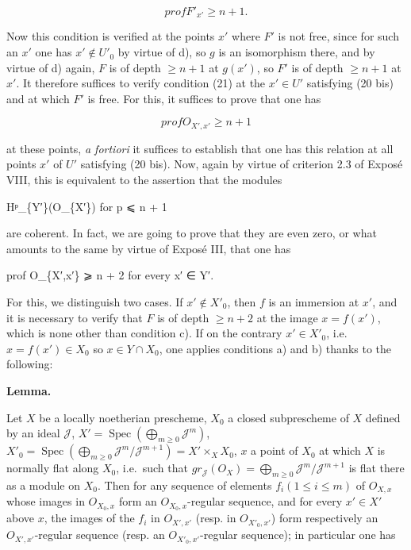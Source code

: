 \documentclass[
  11pt,
  a4paper,
]{book}
\newenvironment{Shaded}{}{}
\newcommand{\NormalTok}[1]{#1}
\newcounter{none} %
\begin{document}
\[ prof F'_{x'} \geqslant n + 1. \]

Now this condition is verified at the points \(x'\) where \(F'\) is not
free, since for such an \(x'\) one has \(x' \notin
U'_{0}\) by virtue of d), so \(g\) is an isomorphism there, and by
virtue of d) again, \(F\) is of depth \(\geqslant n + 1\) at \(g(x')\),
so \(F'\) is of depth \(\geqslant n + 1\) at \(x'\). It therefore
suffices to verify condition (21) at the \(x' \in
U'\) satisfying (20 bis) and at which \(F'\) is free. For this, it
suffices to prove that one has

\[ prof O_{X',x'} \geqslant n + 1 \]

at these points, \emph{a fortiori} it suffices to establish that one has
this relation at all points \(x'\) of \(U'\) satisfying (20 bis). Now,
again by virtue of criterion 2.3 of Exposé VIII, this is equivalent to
the assertion that the modules

\begin{Shaded}
\begin{Highlighting}[]
\NormalTok{Hᵖ\_\{Y′\}(O\_\{X′\}) for p ⩽ n + 1}
\end{Highlighting}
\end{Shaded}

are coherent. In fact, we are going to prove that they are even zero, or
what amounts to the same by virtue of Exposé III, that one has

\begin{Shaded}
\begin{Highlighting}[]
\NormalTok{prof O\_\{X′,x′\} ⩾ n + 2 for every x′ ∈ Y′.}
\end{Highlighting}
\end{Shaded}

For this, we distinguish two cases. If \(x' \notin X'_{0}\), then \(f\)
is an immersion at \(x'\), and it is necessary to verify that \(F\) is
of depth \(\geqslant n + 2\) at the image \(x = f(x')\), which is none
other than condition c). If on the contrary \(x' \in X'_{0}\),
i.e.~\(x = f(x') \in X_{0}\) so \(x \in Y \cap X_{0}\), one applies
conditions a) and b) thanks to the following:

\textbf{Lemma.}

Let \(X\) be a locally noetherian prescheme, \(X_{0}\) a closed
subprescheme of \(X\) defined by an ideal \(\mathcal{J}\), \(X' =
\operatorname{Spec}(\bigoplus_{m\geqslant 0} \mathcal{J}^{m})\),
\(X'_{0} = \operatorname{Spec}(\bigoplus_{m\geqslant 0}
\mathcal{J}^{m}/\mathcal{J}^{m+1}) = X' \times_{X} X_{0}\), \(x\) a
point of \(X_{0}\) at which \(X\) is normally flat along \(X_{0}\),
i.e.~such that
\(gr_{\mathcal{J}}(O_{X}) = \bigoplus_{m\geqslant 0} \mathcal{J}^{m}/\mathcal{J}^{m+1}\)
is flat there as a module on \(X_{0}\). Then for any sequence of
elements \(f_{i} (1 \leqslant i \leqslant m)\) of \(O_{X,x}\) whose
images in \(O_{X_{0},x}\) form an \(O_{X_{0},x}\)-regular sequence, and
for every \(x' \in X'\) above \(x\), the images of the \(f_{i}\) in
\(O_{X',x'}\) (resp. in \(O_{X'_{0},x'}\)) form respectively an
\(O_{X',x'}\)-regular sequence (resp. an \(O_{X'_{0},x'}\)-regular
sequence); in particular one has
\end{document}
